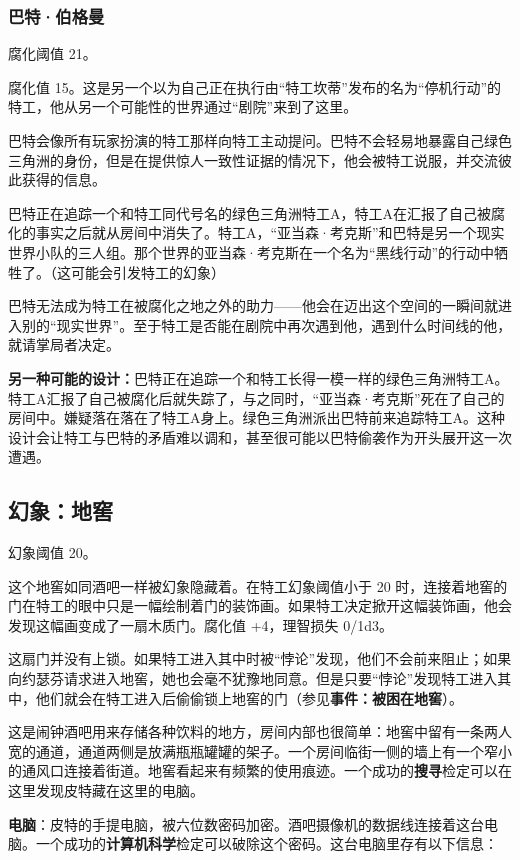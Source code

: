 \subsubsection{巴特·伯格曼}
腐化阈值 21。

腐化值 15。这是另一个以为自己正在执行由“特工坎蒂”发布的名为“停机行动”的特工，他从另一个可能性的世界通过“剧院”来到了这里。

巴特会像所有玩家扮演的特工那样向特工主动提问。巴特不会轻易地暴露自己绿色三角洲的身份，但是在提供惊人一致性证据的情况下，他会被特工说服，并交流彼此获得的信息。

巴特正在追踪一个和特工同代号名的绿色三角洲特工A，特工A在汇报了自己被腐化的事实之后就从房间中消失了。特工A，“亚当森·考克斯”和巴特是另一个现实世界小队的三人组。那个世界的亚当森·考克斯在一个名为“黑线行动”的行动中牺牲了。（这可能会引发特工的幻象）

巴特无法成为特工在被腐化之地之外的助力——他会在迈出这个空间的一瞬间就进入别的“现实世界”。至于特工是否能在剧院中再次遇到他，遇到什么时间线的他，就请掌局者决定。

\textbf{另一种可能的设计：}巴特正在追踪一个和特工长得一模一样的绿色三角洲特工A。特工A汇报了自己被腐化后就失踪了，与之同时，“亚当森·考克斯”死在了自己的房间中。嫌疑落在落在了特工A身上。绿色三角洲派出巴特前来追踪特工A。这种设计会让特工与巴特的矛盾难以调和，甚至很可能以巴特偷袭作为开头展开这一次遭遇。

\subsection{幻象：地窖}
幻象阈值 20。

这个地窖如同酒吧一样被幻象隐藏着。在特工幻象阈值小于 20 时，连接着地窖的门在特工的眼中只是一幅绘制着门的装饰画。如果特工决定掀开这幅装饰画，他会发现这幅画变成了一扇木质门。腐化值 +4，理智损失 0/1d3。

这扇门并没有上锁。如果特工进入其中时被“悖论”发现，他们不会前来阻止；如果向约瑟芬请求进入地窖，她也会毫不犹豫地同意。但是只要“悖论”发现特工进入其中，他们就会在特工进入后偷偷锁上地窖的门（参见\textbf{事件：被困在地窖}）。

这是闹钟酒吧用来存储各种饮料的地方，房间内部也很简单：地窖中留有一条两人宽的通道，通道两侧是放满瓶瓶罐罐的架子。一个房间临街一侧的墙上有一个窄小的通风口连接着街道。地窖看起来有频繁的使用痕迹。一个成功的\textbf{搜寻}检定可以在这里发现皮特藏在这里的电脑。

\textbf{电脑}：皮特的手提电脑，被六位数密码加密。酒吧摄像机的数据线连接着这台电脑。一个成功的\textbf{计算机科学}检定可以破除这个密码。这台电脑里存有以下信息：

